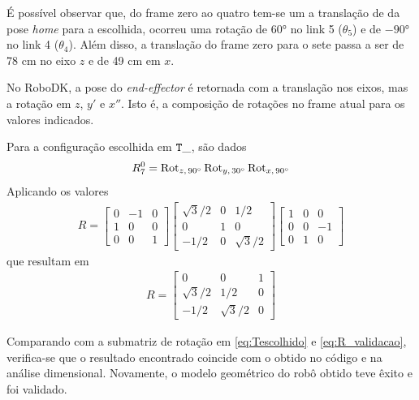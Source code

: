 É possível observar que, do frame zero ao quatro tem-se um a translação de  da pose \textit{home} para a escolhida, ocorreu uma rotação de \ang{60} no link 5 ($\theta_5$) e de $-\ang{90}$ no link 4 ($\theta_4$). Além disso, a translação do frame zero para o sete passa a ser de 78 cm no eixo $z$ e de 49 cm em $x$.

No RoboDK, a pose do \textit{end-effector} é retornada com a translação nos eixos, mas a rotação em $z$, $y'$ e $x''$. Isto é, a composição de rotações no frame atual para os valores indicados.
    
Para a configuração escolhida em $\tt T\_$, são dados
\begin{equation*}
    R_7^0 = \operatorname{Rot}_{z,\,\ang{90}} \operatorname{Rot}_{y,\,\ang{30}} \operatorname{Rot}_{x,\,\ang{90}}
\end{equation*}
Aplicando os valores
\begin{align*}
R = 
\left[ 
\begin{array}{rrr}
    0 & -1 & 0 \\
    1 &  0 & 0 \\
    0 &  0 & 1
\end{array}
\right]
\left[ 
\begin{array}{rrr}
    \sqrt{3}/2 & 0 & 1/2 \\
    0 &  1 & 0 \\
    -1/2 &  0 & \sqrt{3}/2
\end{array}
\right]\left[ 
\begin{array}{rrr}
    1 & 0 &  0 \\
    0 & 0 & -1 \\
    0 & 1 & 0
\end{array}
\right]
\end{align*}
que resultam em
\begin{align}
    R = \left[ 
\begin{array}{rrr}
    0 & 0 & 1 \\
    \sqrt{3}/2 & 1/2 & 0 \\
    -1/2 & \sqrt{3}/2 & 0
\end{array}
\right]
\end{align}

Comparando com a submatriz de rotação em \eqref{eq:Tescolhido} e \eqref{eq:R_validacao}, verifica-se que o resultado encontrado coincide com o obtido no código e na análise dimensional. Novamente, o modelo geométrico do robô obtido teve êxito e foi validado.